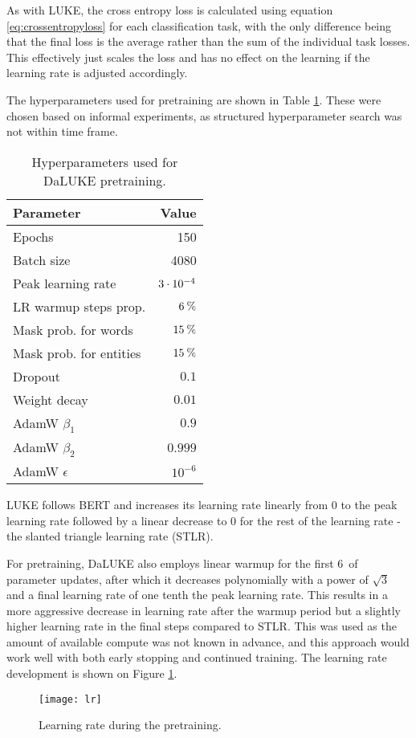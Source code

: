 \documentclass[main.tex]{subfiles}
\begin{document}
As with LUKE, the cross entropy loss is calculated using equation \ref{eq:crossentropyloss} for each classification task, with the only difference being that the final loss is the average rather than the sum of the individual task losses.
This effectively just scales the loss and has no effect on the learning if the learning rate is adjusted accordingly.

The hyperparameters used for pretraining are shown in Table \ref{tab:pretrain-hyper}.
These were chosen based on informal experiments, as structured hyperparameter search was not within time frame.
\begin{table}[H]
    \centering
    \begin{tabular}{l|r}
        Parameter  &    Value\\\hline
        Epochs     & 150\\
        Batch size &    4080\\
        Peak learning rate & $3\cdot10^{-4}$\\
        LR warmup steps prop. & $ 6\:\text{\%{}} $\\
        Mask prob. for words & $ 15\:\text{\%{}} $\\
        Mask prob. for entities & $ 15\:\text{\%{}} $\\
        Dropout & $ 0.1 $\\
        Weight decay & $ 0.01 $\\
        AdamW $ \beta_1 $ & $ 0.9 $\\
        AdamW $ \beta_2 $ & $ 0.999 $\\
        AdamW $ \epsilon $ & $ 10^{-6} $
    \end{tabular}
    \caption{Hyperparameters used for DaLUKE pretraining.}\label{tab:pretrain-hyper}
\end{table}\noindent
LUKE follows BERT and increases its learning rate linearly from 0 to the peak learning rate followed by a linear decrease to 0 for the rest of the learning rate - the slanted triangle learning rate (STLR). \cite{devlin2019bert, yamada2020luke, howardruder2018universal}

For pretraining, DaLUKE also employs linear warmup for the first 6\pro\ of parameter updates, after which it decreases polynomially with a power of $ \sqrt{3} $ and a final learning rate of one tenth the peak learning rate.
This results in a more aggressive decrease in learning rate after the warmup period but a slightly higher learning rate in the final steps compared to STLR.
This was used as the amount of available compute was not known in advance, and this approach would work well with both early stopping and continued training.
The learning rate development is shown on Figure \ref{fig:lr}.
\begin{figure}
    \centering
    \texttt{[image: lr]}
    \caption{Learning rate during the pretraining.}
    \label{fig:lr}
\end{figure}\noindent
\end{document}
